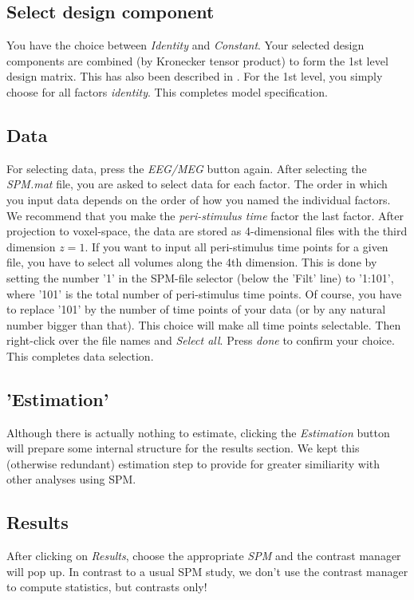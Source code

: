 \subsection{Select design component}
You have the choice between \textit{Identity} and
\textit{Constant}. Your selected design components are combined (by
Kronecker tensor product) to form the 1st level design matrix. This
has also been described in \cite{kiebel_spm_eeg2}. For the 1st level,
you simply choose for all factors \textit{identity}. This completes
model specification.

\subsection{Data}
For selecting data, press the \textit{EEG/MEG} button again. After
selecting the \textit{SPM.mat} file, you are asked to select data for
each factor. The order in which you input data  depends on the order
of how you named the individual factors. We recommend that you make
the \textit{peri-stimulus time} factor the last factor. After
projection to voxel-space, the data are stored as 4-dimensional files
with the third dimension $z = 1$. If you want to input all
peri-stimulus time points for a given file, you have to select all
volumes along the 4th dimension. This is done by setting the number
'1' in the SPM-file selector (below the 'Filt' line) to '1:101', where
'101' is the total number of peri-stimulus time points. Of course, you
have to replace '101' by the number of time points of your
data (or by any natural number bigger than that). This choice will make
all time points selectable. Then right-click over the file 
names and \textit{Select all}. Press \textit{done} to confirm your
choice. This completes data selection.

\subsection{'Estimation'}
Although there is actually nothing to estimate, clicking the
\textit{Estimation} button will prepare some internal structure for
the results section. We kept this (otherwise redundant) estimation step to
provide for greater similiarity with other analyses using SPM.

\subsection{Results}
After clicking on \textit{Results}, choose the appropriate
\textit{SPM} and the contrast manager will pop up. In contrast to a usual
SPM study, we don't use the contrast manager to compute
statistics, but contrasts only!

